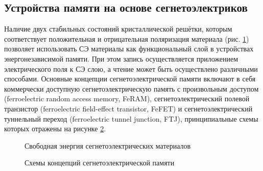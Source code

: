 \subsection{Устройства памяти на основе сегнетоэлектриков}
Наличие двух стабильных состояний кристаллической решётки, которым соответствует положительная и отрицательная поляризация материала (рис. \cref{fig:free_energy}) позволяет использовать СЭ материалы как функциональный слой в устройствах энергонезависимой памяти. При этом запись осуществляется приложением электрического поля к СЭ слою, а чтение может быть осуществлено различными способами. Основные концепции сегнетоэлектрической памяти включают в себя коммерчески доступную сегнетоэлектрическую память с произвольным доступом (ferroelectric random access memory, FeRAM), сегнетоэлектрический полевой транзистор (ferroelectric field-effect transistor, FeFET) и сегнетоэлектрический туннельный переход (ferroelectric tunnel junction, FTJ), принципиальные схемы которых отражены на рисунке \cref{fig:FeRAM}. 


\begin{figure}[ht]
    \caption{Свободная энергия сегнетоэлектрических материалов \cite{hoffmannUnveilingDoublewellEnergy2019}}\label{fig:free_energy}
\end{figure}

\begin{figure}[ht]
    \caption{Схемы концепций сегнетоэлектрической памяти \cite{schroederFundamentalsApplicationsFerroelectric2022}}\label{fig:FeRAM}
\end{figure}


\FloatBarrier
